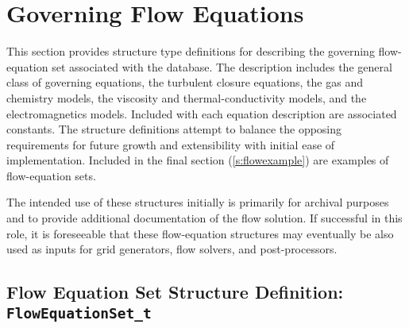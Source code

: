 \section{Governing Flow Equations}
\label{s:floweqn}
\thispagestyle{plain}

This section provides structure type definitions for describing the
governing flow-equation set associated with the database.
The description includes the general class of governing equations, the
turbulent closure equations, the gas and chemistry models, the
viscosity and thermal-conductivity models, and the electromagnetics
models.
Included with each equation description are associated constants.
The structure definitions attempt to balance the opposing requirements
for future growth and extensibility with initial ease of implementation.
Included in the final section (\autoref{s:flowexample}) are examples of
flow-equation sets.

The intended use of these structures initially is primarily for archival
purposes and to provide additional documentation of the flow solution.
If successful in this role, it is foreseeable that these flow-equation
structures may eventually be also used as inputs for grid generators,
flow solvers, and post-processors.

\subsection{Flow Equation Set Structure Definition: \texttt{FlowEquationSet\_t}}
\label{s:FlowEquationSet}


